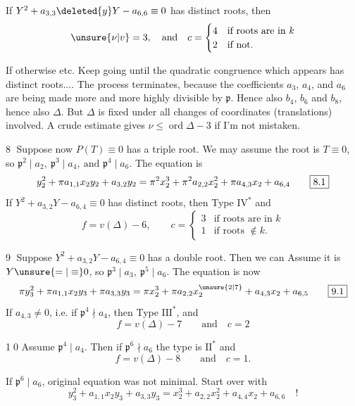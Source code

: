 If $Y^2+a_{3,3}\deleted{y}Y-a_{6,6}\equiv0$ has distinct roots, then
\[
 \unsure{\nu|v}=3,\quad\text{and}\quad c=\begin{cases}
 4&\text{if roots are in }k\\
 2&\text{if not}.
 \end{cases}
\]

If otherwise  etc. Keep going until the quadratic congruence which appears has distinct roots.... The process terminates, because the coefficients $a_3$, $a_4$, and $a_6$ are being made more and more highly divisible by $\mathfrak p$. Hence also $b_4$, $b_6$ and $b_8$, hence also $\Delta$. But $\Delta$ is fixed under all changes of coordinates (translations) involved. A crude estimate gives $\nu\leq\operatorname{ord}\Delta-3$ if I'm not mistaken.

\textcircled{8} Suppose now $P(T)\equiv0$ has a triple root. We may assume the root is $T\equiv0$, so $\boxed{\mathfrak p^2\mid a_2,\ \mathfrak p^3\mid a_4,\ \text{and }\mathfrak p^4\mid a_6}$. The equation is
\[
 y_2^2+\pi a_{1,1}x_2y_2+a_{3,2}y_2
 =\pi^2x_2^3+\pi^2 a_{2,2}x_2^2+\pi a_{4,3}x_2+a_{6,4}
 \tag*{\fbox{8.1}}
\]
If $Y^2+a_{3,2}Y-a_{6,4}\equiv0$ has distinct roots, then Type $\mathrm{IV}^{*}$ and
\[
 f=v(\Delta)-6,\qquad c=\begin{cases}3&\text{if roots are in }k\\1&\text{if roots }\notin k.\end{cases}
\]

\textcircled{9} Suppose $Y^2+a_{3,2}Y-a_{6,4}\equiv0$ has a double root. Then we can Assume it is $Y\unsure{=|\equiv}0$, so $\boxed{\mathfrak p^3\mid a_3,\ \mathfrak p^5\mid a_6}$. The equation is now
\[
 \pi y_3^2+\pi a_{1,1}x_2y_3+\pi a_{3,3}y_3
 =\pi x_2^3+\pi a_{2,2}x_2^{\unsure{2|7}}+a_{4,3}x_2+a_{6,5}
 \tag*{\fbox{9.1}}
\]
If $a_{4,3}\ne0$, i.e. if $\mathfrak p^4\nmid a_4$, then Type $\mathrm{III}^{*}$, and
\[
 f=v(\Delta)-7\qquad\text{and}\quad c=2
\]

\textcircled{\scriptsize 10} Assume $\boxed{\mathfrak p^4\mid a_4}$. Then if $\mathfrak p^6\nmid a_6$ the type is $\mathrm{II}^{*}$ and
\[
 f=v(\Delta)-8\qquad\text{and}\quad c=1.
\]
\normalmarginpar

If $\mathfrak p^6\mid a_6$, original equation was not minimal. Start over with
\[
 y_3^2+a_{1,1}x_2y_3+a_{3,3}y_3=x_2^3+a_{2,2}x_2^2+a_{4,4}x_2+a_{6,6}\quad!
\]
